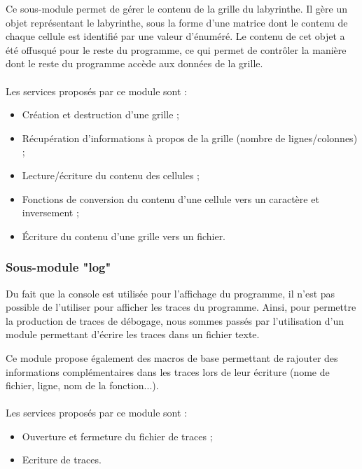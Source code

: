 \documentclass{book}
\begin{document}
Ce sous-module permet de gérer le contenu de la grille du labyrinthe. Il gère un objet représentant le labyrinthe, sous la forme d'une matrice dont le contenu de chaque cellule est identifié par une valeur d'énuméré.
Le contenu de cet objet a été offusqué pour le reste du programme, ce qui permet de contrôler la manière dont le reste du programme accède aux données de la grille.

\paragraph{}
Les services proposés par ce module sont :
\begin{itemize}
	\item Création et destruction d'une grille ;
	\item Récupération d'informations à propos de la grille (nombre de lignes/colonnes) ;
	\item Lecture/écriture du contenu des cellules ;
	\item Fonctions de conversion du contenu d'une cellule vers un caractère et inversement ;
	\item Écriture du contenu d'une grille vers un fichier.
\end{itemize}


\subsubsection{Sous-module "log"}

Du fait que la console est utilisée pour l'affichage du programme, il n'est pas possible de l'utiliser pour afficher les traces du programme. Ainsi, pour permettre la production de traces de débogage, nous sommes passés par l'utilisation d'un module permettant d'écrire les traces dans un fichier texte.

Ce module propose également des macros de base permettant de rajouter des informations complémentaires dans les traces lors de leur écriture (nome de fichier, ligne, nom de la fonction...).

\paragraph{}
Les services proposés par ce module sont :
\begin{itemize}
	\item Ouverture et fermeture du fichier de traces ;
	\item Ecriture de traces.
\end{itemize}
\end{document}
